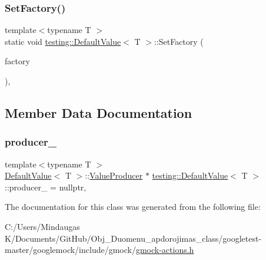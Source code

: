\subsubsection{\texorpdfstring{SetFactory()}{SetFactory()}\hspace{0.1cm}{\footnotesize\ttfamily [3/3]}}
{\footnotesize\ttfamily template$<$typename T $>$ \\
static void \mbox{\hyperlink{classtesting_1_1_default_value}{testing\+::\+Default\+Value}}$<$ T $>$\+::Set\+Factory (\begin{DoxyParamCaption}\item[{\mbox{\hyperlink{classtesting_1_1_default_value_a5763a68d75e0a4c97fcaff708e2df803}{Factory\+Function}}}]{factory }\end{DoxyParamCaption})\hspace{0.3cm}{\ttfamily [inline]}, {\ttfamily [static]}}



\subsection{Member Data Documentation}
\mbox{\label{classtesting_1_1_default_value_a69d60d7538ccf71d9f47164320a3bf28}} 
\subsubsection{\texorpdfstring{producer\_}{producer\_}}
{\footnotesize\ttfamily template$<$typename T $>$ \\
\mbox{\hyperlink{classtesting_1_1_default_value}{Default\+Value}}$<$ T $>$\+::\mbox{\hyperlink{classtesting_1_1_default_value_1_1_value_producer}{Value\+Producer}} $\ast$ \mbox{\hyperlink{classtesting_1_1_default_value}{testing\+::\+Default\+Value}}$<$ T $>$\+::producer\+\_\+ = nullptr\hspace{0.3cm}{\ttfamily [static]}, {\ttfamily [private]}}



The documentation for this class was generated from the following file\+:\begin{DoxyCompactItemize}
\item 
C\+:/\+Users/\+Mindaugas K/\+Documents/\+Git\+Hub/\+Obj\+\_\+\+Duomenu\+\_\+apdorojimas\+\_\+class/googletest-\/master/googlemock/include/gmock/\mbox{\hyperlink{googletest-master_2googlemock_2include_2gmock_2gmock-actions_8h}{gmock-\/actions.\+h}}\end{DoxyCompactItemize}
